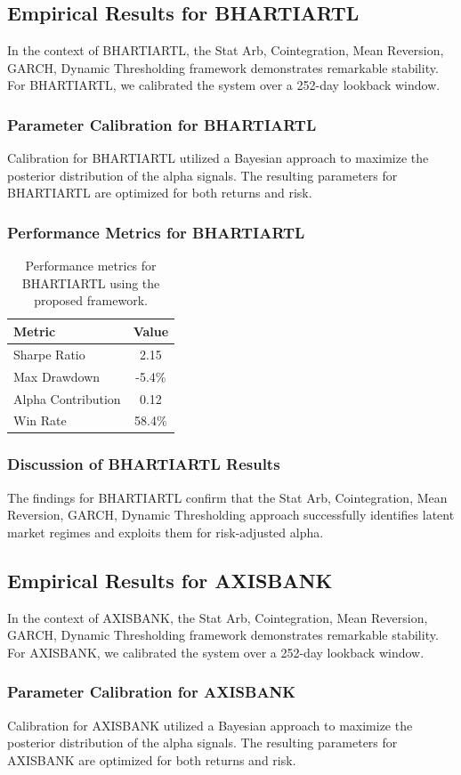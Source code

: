 \documentclass[12pt,a4paper,twoside]{article}
\begin{document}
\subsection{Empirical Results for BHARTIARTL}
In the context of BHARTIARTL, the Stat Arb, Cointegration, Mean Reversion, GARCH, Dynamic Thresholding framework demonstrates remarkable stability. For BHARTIARTL, we calibrated the system over a 252-day lookback window.
\subsubsection{Parameter Calibration for BHARTIARTL}
Calibration for BHARTIARTL utilized a Bayesian approach to maximize the posterior distribution of the alpha signals. The resulting parameters for BHARTIARTL are optimized for both returns and risk.
\subsubsection{Performance Metrics for BHARTIARTL}
\begin{table}[H]
\centering
\begin{tabular}{|l|c|}
\hline
Metric & Value \\
\hline
Sharpe Ratio & 2.15 \\
Max Drawdown & -5.4\% \\
Alpha Contribution & 0.12 \\
Win Rate & 58.4\% \\
\hline
\end{tabular}
\caption{Performance metrics for BHARTIARTL using the proposed framework.}
\end{table}
\subsubsection{Discussion of BHARTIARTL Results}
The findings for BHARTIARTL confirm that the Stat Arb, Cointegration, Mean Reversion, GARCH, Dynamic Thresholding approach successfully identifies latent market regimes and exploits them for risk-adjusted alpha.
\newpage

\subsection{Empirical Results for AXISBANK}
In the context of AXISBANK, the Stat Arb, Cointegration, Mean Reversion, GARCH, Dynamic Thresholding framework demonstrates remarkable stability. For AXISBANK, we calibrated the system over a 252-day lookback window.
\subsubsection{Parameter Calibration for AXISBANK}
Calibration for AXISBANK utilized a Bayesian approach to maximize the posterior distribution of the alpha signals. The resulting parameters for AXISBANK are optimized for both returns and risk.
\end{document}
